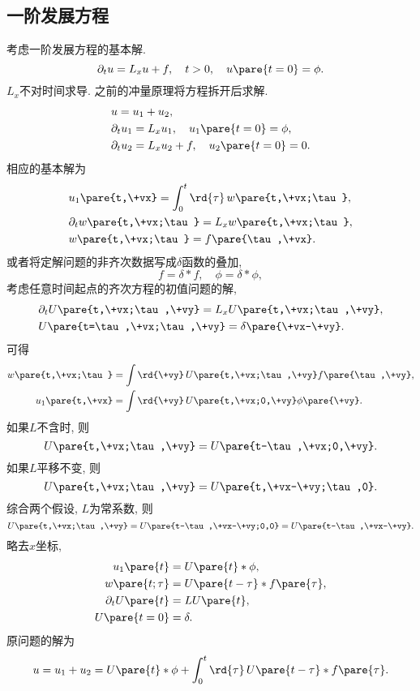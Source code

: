 \documentclass[hidelinks]{ctexart}
\begin{document}

\subsection{一阶发展方程} %
\label{sub:一阶发展方程}

\newpoint{}考虑一阶发展方程的基本解.
\[ \partial_t u = L_{x}u + f,\quad t>0,\quad u\pare{t=0} = \phi. \]
$L_x$不对时间求导. 之前的冲量原理将方程拆开后求解.
\begin{align*}
    & u = u_1 + u_2, \\
    & \partial_t u_1 = L_x u_1,\quad u_1\pare{t=0} = \phi, \\
    & \partial_t u_2 = L_x u_2 + f,\quad u_2\pare{t=0} = 0.
\end{align*}
相应的基本解为
\begin{align*}
    & u_1\pare{t,\+vx} = \int_0^t \rd{\tau}\,w\pare{t,\+vx;\tau}, \\
    & \partial_t w\pare{t,\+vx;\tau} = L_x w\pare{t,\+vx;\tau}, \\
    & w\pare{t,\+vx;\tau} = f\pare{\tau,\+vx}.
\end{align*}
\newpoint{}或者将定解问题的非齐次数据写成$\delta$函数的叠加,
\[ f = \delta * f,\quad \phi = \delta * \phi, \]
考虑任意时间起点的齐次方程的初值问题的解,
\begin{align*}
    & \partial_t U\pare{t,\+vx;\tau,\+vy} = L_x U\pare{t,\+vx;\tau,\+vy}, \\
    & U\pare{t=\tau,\+vx;\tau,\+vy} = \delta\pare{\+vx-\+vy}.
\end{align*}
可得
\begin{align*}
    w\pare{t,\+vx;\tau} &= \int \rd{\+vy}\, U\pare{t,\+vx;\tau,\+vy} f\pare{\tau,\+vy}, \\
    u_1\pare{t,\+vx} &= \int \rd{\+vy}\, U\pare{t,\+vx;0,\+vy} \phi\pare{\+vy}.
\end{align*}
如果$L$不含时, 则
\[ U\pare{t,\+vx;\tau,\+vy} = U\pare{t-\tau,\+vx;0,\+vy}. \]
如果$L$平移不变, 则
\[ U\pare{t,\+vx;\tau,\+vy} = U\pare{t,\+vx-\+vy;\tau,0}. \]
综合两个假设, $L$为常系数, 则
\[ U\pare{t,\+vx;\tau,\+vy} = U\pare{t-\tau,\+vx-\+vy;0,0} = U\pare{t-\tau,\+vx-\+vy}. \]
略去$x$坐标,
\begin{align*}
    u_1\pare{t} &= U\pare{t} * \phi, \\
    w\pare{t;\tau} &= U\pare{t-\tau} * f\pare{\tau}, \\
    \partial_t U\pare{t} &= LU\pare{t}, \\
    U\pare{t=0} &= \delta.
\end{align*}
原问题的解为
\[ u = u_1 + u_2 = U\pare{t}*\phi + \int_0^t \rd{\tau}\, U\pare{t-\tau}*f\pare{\tau}. \]
\end{document}
